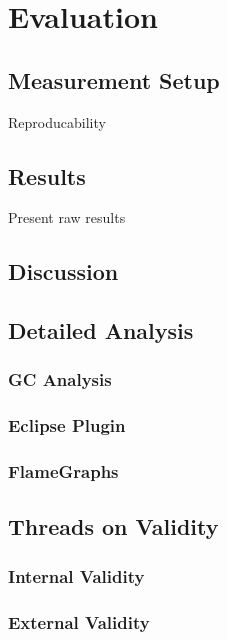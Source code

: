 \chapter{Evaluation}
\label{chap:analysis}


\section{Measurement Setup}

Reproducability

\section{Results}

Present raw results


\section{Discussion}
\label{discussion}


\section{Detailed Analysis}


\subsection{GC Analysis}
\label{gc_analysis}

\subsection{Eclipse Plugin}
\label{eclipse_plugin}

\subsection{FlameGraphs}
\label{flame_graph}



\section{Threads on Validity}

\subsection{Internal Validity}

\subsection{External Validity}